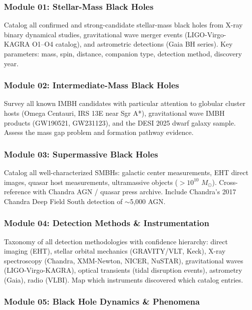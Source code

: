 \documentclass[11pt,letterpaper]{article}
\begin{document}
\subsubsection{Module 01: Stellar-Mass Black Holes}

Catalog all confirmed and strong-candidate stellar-mass black holes from X-ray binary dynamical studies, gravitational wave merger events (LIGO-Virgo-KAGRA O1--O4 catalog), and astrometric detections (Gaia BH series). Key parameters: mass, spin, distance, companion type, detection method, discovery year.

\subsubsection{Module 02: Intermediate-Mass Black Holes}

Survey all known IMBH candidates with particular attention to globular cluster hosts (Omega Centauri, IRS 13E near Sgr A*), gravitational wave IMBH products (GW190521, GW231123), and the DESI 2025 dwarf galaxy sample. Assess the mass gap problem and formation pathway evidence.

\subsubsection{Module 03: Supermassive Black Holes}

Catalog all well-characterized SMBHs: galactic center measurements, EHT direct images, quasar host measurements, ultramassive objects ($>10^{10}$ $M_\odot$). Cross-reference with Chandra AGN / quasar press archive. Include Chandra's 2017 Chandra Deep Field South detection of $\sim$5,000 AGN.

\subsubsection{Module 04: Detection Methods \& Instrumentation}

Taxonomy of all detection methodologies with confidence hierarchy: direct imaging (EHT), stellar orbital mechanics (GRAVITY/VLT, Keck), X-ray spectroscopy (Chandra, XMM-Newton, NICER, NuSTAR), gravitational waves (LIGO-Virgo-KAGRA), optical transients (tidal disruption events), astrometry (Gaia), radio (VLBI). Map which instruments discovered which catalog entries.

\subsubsection{Module 05: Black Hole Dynamics \& Phenomena}
\end{document}
